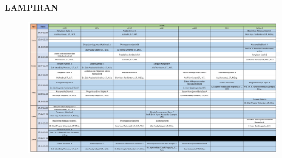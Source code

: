 \begin{center}
    \Large
    \textbf{LAMPIRAN}
  \end{center}
\begin{figure}
    \includegraphics[scale=0.5]{gambar/jadwal.jpg}
\end{figure}